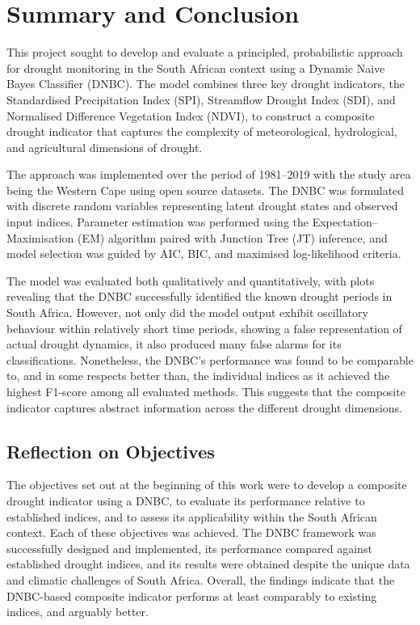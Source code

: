 \graphicspath{{conclusion/fig/}}

\chapter{Summary and Conclusion}
\label{chap:conclusion}

This project sought to develop and evaluate a principled, probabilistic approach for drought monitoring in the South African context using a Dynamic Naive Bayes Classifier (DNBC). The model combines three key drought indicators, the Standardised Precipitation Index (SPI), Streamflow Drought Index (SDI), and Normalised Difference Vegetation Index (NDVI), to construct a composite drought indicator that captures the complexity of meteorological, hydrological, and agricultural dimensions of drought. 

The approach was implemented over the period of 1981–2019 with the study area being the Western Cape using open source datasets. The DNBC was formulated with discrete random variables representing latent drought states and observed input indices. Parameter estimation was performed using the Expectation–Maximisation (EM) algorithm paired with Junction Tree (JT) inference, and model selection was guided by AIC, BIC, and maximised log-likelihood criteria.

The model was evaluated both qualitatively and quantitatively, with plots revealing that the DNBC successfully identified the known drought periods in South Africa. However, not only did the model output exhibit oscillatory behaviour within relatively short time periods, showing a false representation of actual drought dynamics, it also produced many false alarms for its classifications. Nonetheless, the DNBC’s performance was found to be comparable to, and in some respects better than, the individual indices as it achieved the highest F1-score among all evaluated methods. This suggests that the composite indicator captures abstract information across the different drought dimensions.

\section*{Reflection on Objectives}
The objectives set out at the beginning of this work were to develop a composite drought indicator using a DNBC, to evaluate its performance relative to established indices, and to assess its applicability within the South African context. Each of these objectives was achieved. The DNBC framework was successfully designed and implemented, its performance compared against established drought indices, and its results were obtained despite the unique data and climatic challenges of South Africa. Overall, the findings indicate that the DNBC-based composite indicator performs at least comparably to existing indices, and arguably better.

